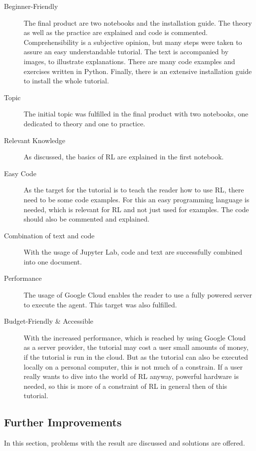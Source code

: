 \documentclass[10pt,a4paper]{article}
\begin{document}
		\begin{description}
		\item[Beginner-Friendly] The final product are two notebooks and the installation guide. The theory as well as the practice are explained and code is commented. 
		Comprehensibility is a subjective opinion, but many steps were taken to assure an easy understandable tutorial.
		The text is accompanied by images, to illustrate explanations.
		There are many code examples and exercises written in Python.
		Finally, there is an extensive installation guide to install the whole tutorial.
		
		\item[Topic] The initial topic was fulfilled in the final product with two notebooks, one dedicated to theory and one to practice. 
		
		\item[Relevant Knowledge] As discussed, the basics of RL are explained in the first notebook.  
		
		\item[Easy Code] As the target for the tutorial is to teach the reader how to use RL, there need to be some code examples. For this an easy programming language is needed, which is relevant for RL and not just used for examples. The code should also be commented and explained.\\ 
		
		\item[Combination of text and code] With the usage of Jupyter Lab, code and text are successfully combined into one document. 
		
		\item[Performance] The usage of Google Cloud enables the reader to use a fully powered server to execute the agent. This target was also fulfilled.
		
		\item[Budget-Friendly \& Accessible] With the increased performance, which is reached by using Google Cloud as a server provider, the tutorial may cost a user small amounts of money, if the tutorial is run in the cloud. 
		But as the tutorial can also be executed locally on a personal computer, this is not much of a constrain. 
		If a user really wants to dive into the world of RL anyway, powerful hardware is needed, so this is more of a constraint of RL in general then of this tutorial.
	\end{description}
	\subsection{Further Improvements}
	In this section, problems with the result are discussed and solutions are offered.
	
\end{document}
